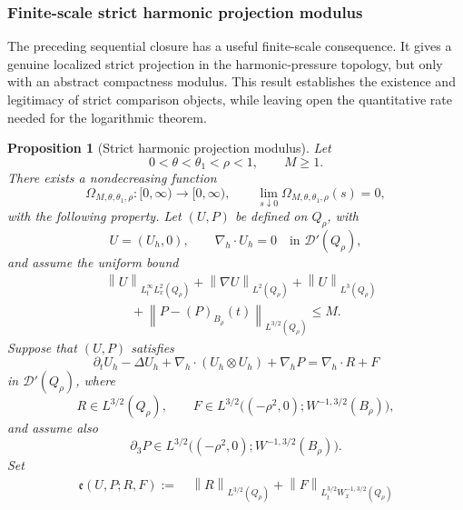 \documentclass[11pt]{article}
\numberwithin{equation}{section}
\theoremstyle{plain}
\newtheorem{proposition}{Proposition}[section]
\theoremstyle{definition}
\theoremstyle{remark}
\newcommand{\nabh}{\nabla_h}
\newcommand{\divh}{\nabla_h\!\cdot}
\newcommand{\norm}[2]{\left\|#1\right\|_{#2}}
\begin{document}
\subsubsection{Finite-scale strict harmonic projection modulus}
\label{pI:subsec:strict-projection-modulus}

The preceding sequential closure has a useful finite-scale consequence.  It gives a genuine localized strict projection in the harmonic-pressure topology, but only with an abstract compactness modulus.  This result establishes the existence and legitimacy of strict comparison objects, while leaving open the quantitative rate needed for the logarithmic theorem.

\begin{proposition}[Strict harmonic projection modulus]
\label{pI:prop:strict-harmonic-projection-modulus}
Let
\[
        0<\theta<\theta_1<\rho<1,
        \qquad
        M\ge1 .
\]
There exists a nondecreasing function
\[
        \Omega_{M,\theta,\theta_1,\rho}:[0,\infty)\to[0,\infty),
        \qquad
        \lim_{s\downarrow0}\Omega_{M,\theta,\theta_1,\rho}(s)=0,
\]
with the following property.  Let \((U,P)\) be defined on \(Q_\rho\), with
\[
        U=(U_h,0),
        \qquad
        \divh U_h=0
        \quad\text{in }\mathcal D'(Q_\rho),
\]
and assume the uniform bound
\begin{equation}\label{pI:eq:single-rough-shadow-bound}
\begin{aligned}
&\norm{U}{L^\infty_tL^2_x(Q_\rho)}
+
\norm{\nabla U}{L^2(Q_\rho)}
+
\norm{U}{L^3(Q_\rho)}
\\
&\qquad
+
\norm{P-(P)_{B_\rho}(t)}{L^{3/2}(Q_\rho)}
\le M .
\end{aligned}
\end{equation}
Suppose that \((U,P)\) satisfies
\begin{equation}\label{pI:eq:single-approx-horizontal-limiting}
        \partial_tU_h-\Delta U_h
        +\divh(U_h\otimes U_h)
        +\nabh P
        =\divh R+F
\end{equation}
in \(\mathcal D'(Q_\rho)\), where
\[
        R\in L^{3/2}(Q_\rho),
        \qquad
        F\in L^{3/2}\bigl((-\rho^2,0);W^{-1,3/2}(B_\rho)\bigr),
\]
and assume also
\[
        \partial_3P\in
        L^{3/2}\bigl((-\rho^2,0);W^{-1,3/2}(B_\rho)\bigr).
\]
Set
\begin{equation}\label{pI:eq:strict-projection-defect-size}
\begin{aligned}
        \mathfrak e(U,P;R,F)
        :=&\ \norm{R}{L^{3/2}(Q_\rho)}
        +\norm{F}{L^{3/2}_tW^{-1,3/2}_x(Q_\rho)}

\end{aligned}
\end{equation}
\end{proposition}
\end{document}
